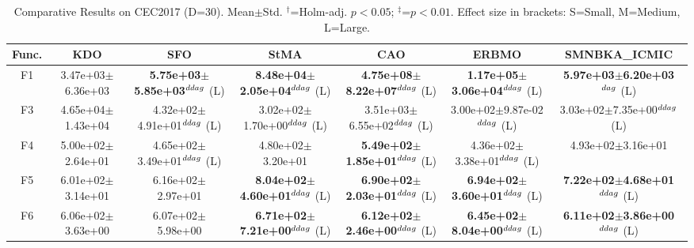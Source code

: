 \begin{table}[!t]
\centering\small
\caption{Comparative Results on CEC2017 (D=30). Mean$\pm$Std. $^{\dag}$=Holm-adj. $p<0.05$; $^{\ddag}$=$p<0.01$. Effect size in brackets: S=Small, M=Medium, L=Large.}
\label{tab:enhanced}
\begin{tabular}{c|cccccc}
\hline
Func. & \textbf{KDO} & SFO & StMA & CAO & ERBMO & SMNBKA_ICMIC \\ \hline\hline
F1  & 3.47e+03$\pm$6.36e+03  & \textbf{5.75e+03$\pm$5.85e+03}$^{\\ddag}$ (L)  & \textbf{8.48e+04$\pm$2.05e+04}$^{\\ddag}$ (L)  & \textbf{4.75e+08$\pm$8.22e+07}$^{\\ddag}$ (L)  & \textbf{1.17e+05$\pm$3.06e+04}$^{\\ddag}$ (L)  & \textbf{5.97e+03$\pm$6.20e+03}$^{\\dag}$ (L) \\ \hline
F3  & 4.65e+04$\pm$1.43e+04  & 4.32e+02$\pm$4.91e+01$^{\\ddag}$ (L)  & 3.02e+02$\pm$1.70e+00$^{\\ddag}$ (L)  & 3.51e+03$\pm$6.55e+02$^{\\ddag}$ (L)  & 3.00e+02$\pm$9.87e-02$^{\\ddag}$ (L)  & 3.03e+02$\pm$7.35e+00$^{\\ddag}$ (L) \\ \hline
F4  & 5.00e+02$\pm$2.64e+01  & 4.65e+02$\pm$3.49e+01$^{\\ddag}$ (L)  & 4.80e+02$\pm$3.20e+01   & \textbf{5.49e+02$\pm$1.85e+01}$^{\\ddag}$ (L)  & 4.36e+02$\pm$3.38e+01$^{\\ddag}$ (L)  & 4.93e+02$\pm$3.16e+01  \\ \hline
F5  & 6.01e+02$\pm$3.14e+01  & 6.16e+02$\pm$2.97e+01   & \textbf{8.04e+02$\pm$4.60e+01}$^{\\ddag}$ (L)  & \textbf{6.90e+02$\pm$2.03e+01}$^{\\ddag}$ (L)  & \textbf{6.94e+02$\pm$3.60e+01}$^{\\ddag}$ (L)  & \textbf{7.22e+02$\pm$4.68e+01}$^{\\ddag}$ (L) \\ \hline
F6  & 6.06e+02$\pm$3.63e+00  & 6.07e+02$\pm$5.98e+00   & \textbf{6.71e+02$\pm$7.21e+00}$^{\\ddag}$ (L)  & \textbf{6.12e+02$\pm$2.46e+00}$^{\\ddag}$ (L)  & \textbf{6.45e+02$\pm$8.04e+00}$^{\\ddag}$ (L)  & \textbf{6.11e+02$\pm$3.86e+00}$^{\\ddag}$ (L) \\ \hline

\end{tabular}
\end{table}
